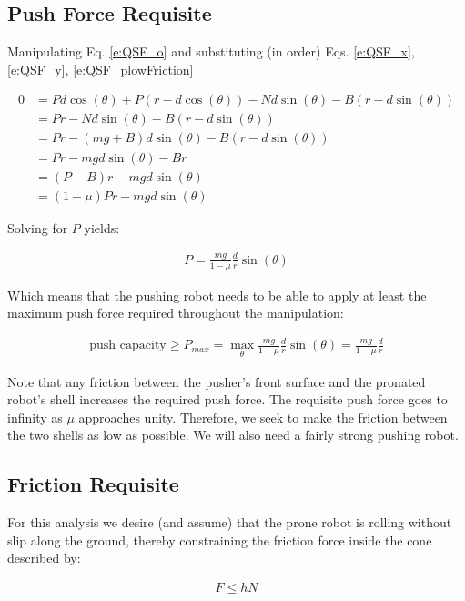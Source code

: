 \documentclass[letterpaper]{report}
\begin{document}
\subsection{Push Force Requisite}
Manipulating Eq. \ref{e:QSF_o} and substituting (in order) Eqs. \ref{e:QSF_x}, \ref{e:QSF_y}, \ref{e:QSF_plowFriction}

\begin{align}
  0 &= P d \cos(\theta) + P(r - d \cos(\theta)) - N d \sin(\theta) - B (r - d \sin(\theta))
  \\&= Pr - N d \sin(\theta) - B (r - d \sin(\theta))
  \\&= Pr - (mg + B) d \sin(\theta) - B (r - d \sin(\theta))
  \\&= Pr - mg d \sin(\theta) - B r
  \\&= (P - B)r - mg d \sin(\theta)
  \\&= (1-\mu) P r - mg d \sin(\theta)
\end{align}

Solving for $P$ yields:

\begin{align}
  P = \frac{mg}{1-\mu} \frac{d}{r} \sin(\theta)
\end{align}

Which means that the pushing robot needs to be able to apply at least the maximum push force required throughout the manipulation:

\begin{align}
  \text{push capacity} \geq P_{max} = \max_\theta \frac{mg}{1-\mu} \frac{d}{r} \sin(\theta) = \frac{mg}{1-\mu} \frac{d}{r}
\end{align}

Note that any friction between the pusher's front surface and the pronated robot's shell increases the required push force.
The requisite push force goes to infinity as $\mu$ approaches unity.
Therefore, we seek to make the friction between the two shells as low as possible.
We will also need a fairly strong pushing robot.

\subsection{Friction Requisite}
For this analysis we desire (and assume) that the prone robot is rolling without slip along the ground, thereby constraining the friction force inside the cone described by:

\begin{align}
  F \leq h N \label{e:QSF_groundFriction}
\end{align}
\end{document}
